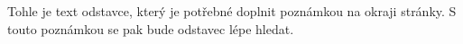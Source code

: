 Tohle je text
odstavce, který je potřebné doplnit poznámkou
na okraji stránky. S touto poznámkou se pak bude
odstavec lépe hledat.